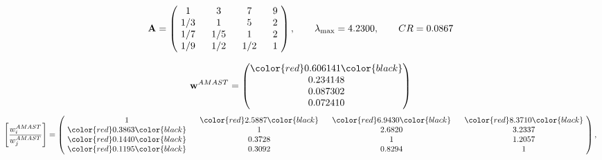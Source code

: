 \begin{example}
\begin{equation*}
\mathbf{A} =
\begin{pmatrix}
$\,\,$ 1 $\,\,$ & $\,\,$3$\,\,$ & $\,\,$7$\,\,$ & $\,\,$9 $\,\,$ \\
$\,\,$ 1/3$\,\,$ & $\,\,$ 1 $\,\,$ & $\,\,$5$\,\,$ & $\,\,$2 $\,\,$ \\
$\,\,$ 1/7$\,\,$ & $\,\,$ 1/5$\,\,$ & $\,\,$ 1 $\,\,$ & $\,\,$2 $\,\,$ \\
$\,\,$ 1/9$\,\,$ & $\,\,$ 1/2$\,\,$ & $\,\,$ 1/2$\,\,$ & $\,\,$ 1  $\,\,$ \\
\end{pmatrix},
\qquad
\lambda_{\max} =
4.2300,
\qquad
CR = 0.0867
\end{equation*}

\begin{equation*}
\mathbf{w}^{AMAST} =
\begin{pmatrix}
\color{red} 0.606141\color{black} \\
0.234148\\
0.087302\\
0.072410
\end{pmatrix}\end{equation*}
\begin{equation*}
\left[ \frac{{w}^{AMAST}_i}{{w}^{AMAST}_j} \right] =
\begin{pmatrix}
$\,\,$ 1 $\,\,$ & $\,\,$\color{red} 2.5887\color{black} $\,\,$ & $\,\,$\color{red} 6.9430\color{black} $\,\,$ & $\,\,$\color{red} 8.3710\color{black} $\,\,$ \\
$\,\,$\color{red} 0.3863\color{black} $\,\,$ & $\,\,$ 1 $\,\,$ & $\,\,$2.6820$\,\,$ & $\,\,$3.2337  $\,\,$ \\
$\,\,$\color{red} 0.1440\color{black} $\,\,$ & $\,\,$0.3728$\,\,$ & $\,\,$ 1 $\,\,$ & $\,\,$1.2057 $\,\,$ \\
$\,\,$\color{red} 0.1195\color{black} $\,\,$ & $\,\,$0.3092$\,\,$ & $\,\,$0.8294$\,\,$ & $\,\,$ 1  $\,\,$ \\
\end{pmatrix},
\end{equation*}


\end{example}
